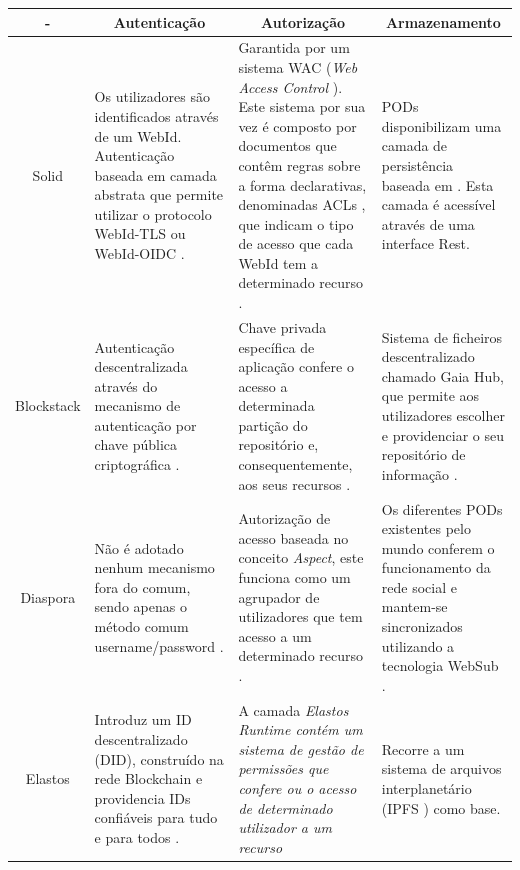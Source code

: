 \begin{center}
\small
\begin{longtable}{c|p{4cm}|p{4cm}|p{4cm}}
\toprule 
    \multicolumn{1}{c}{-} &
    \multicolumn{1}{c}{Autenticação} &
    \multicolumn{1}{c}{Autorização} &
    \multicolumn{1}{c}{Armazenamento}
    \\ \midrule\addlinespace[2pt] \endhead

\bottomrule\endfoot

Solid & Os utilizadores são identificados através de um WebId. Autenticação baseada em camada abstrata que permite utilizar o protocolo WebId-TLS ou WebId-OIDC \cite{solid_spec}. &  Garantida por um sistema WAC (\emph{Web Access Control} \label{sym:WAC}). Este sistema por sua vez é composto por documentos que contêm regras sobre a forma declarativas, denominadas ACLs \label{sym:ACL}, que indicam o tipo de acesso que cada WebId tem a determinado recurso \cite{solid_web_access_control}. & PODs disponibilizam uma camada de persistência baseada em \label{sym:LDP}. Esta camada é acessível através de uma interface Rest. \cite{solid_spec} \\
Blockstack & Autenticação descentralizada através do mecanismo de autenticação por chave pública criptográfica \cite{blockstack_white_paper}. & Chave privada específica de aplicação confere o acesso a determinada partição do repositório e, consequentemente, aos seus recursos \cite{blockstack_white_paper}. & Sistema de ficheiros descentralizado chamado Gaia Hub, que permite aos utilizadores escolher e providenciar o seu repositório de informação \cite{blockstack_white_paper}. \\
Diaspora & Não é adotado nenhum mecanismo fora do comum, sendo apenas o método comum username/password \cite{diaspora_wiki}. & Autorização de acesso baseada no conceito \emph{Aspect}, este funciona como um agrupador de utilizadores que tem acesso a um determinado recurso \cite{diaspora_wiki}. & Os diferentes PODs \label{sym:POD} existentes pelo mundo conferem o funcionamento da rede social e mantem-se sincronizados utilizando a tecnologia WebSub \cite{diaspora_wiki}. \\
Elastos & Introduz um ID descentralizado (DID), construído na rede Blockchain e providencia IDs confiáveis para tudo e para todos \cite{elastos_white_paper}. & A camada \emph{Elastos Runtime contém um sistema de gestão de permissões que confere ou o acesso de determinado utilizador a um recurso} \cite{elastos_white_paper} & Recorre a um sistema de arquivos interplanetário (IPFS \label{sym:IPFS}) como base. \cite{elastos_developer} \\

\end{longtable}

\end{center}

